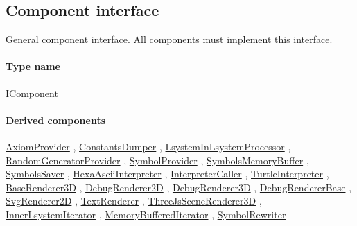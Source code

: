 \subsection{Component interface}
\label{Malsys.Processing.Components.IComponent}
General component interface. All components must implement this interface.\paragraph{Type name}
IComponent	\paragraph{Derived components}
		\hyperref[Malsys.Processing.Components.Common.AxiomProvider]{AxiomProvider}%
, 		\hyperref[Malsys.Processing.Components.Common.ConstantsDumper]{ConstantsDumper}%
, 		\hyperref[Malsys.Processing.Components.Common.LsystemInLsystemProcessor]{LsystemInLsystemProcessor}%
, 		\hyperref[Malsys.Processing.Components.Common.RandomGeneratorProvider]{RandomGeneratorProvider}%
, 		\hyperref[Malsys.Processing.Components.Common.SymbolProvider]{SymbolProvider}%
, 		\hyperref[Malsys.Processing.Components.Common.SymbolsMemoryBuffer]{SymbolsMemoryBuffer}%
, 		\hyperref[Malsys.Processing.Components.Common.SymbolsSaver]{SymbolsSaver}%
, 		\hyperref[Malsys.Processing.Components.Interpreters.HexaAsciiInterpreter]{HexaAsciiInterpreter}%
, 		\hyperref[Malsys.Processing.Components.Interpreters.InterpreterCaller]{InterpreterCaller}%
, 		\hyperref[Malsys.Processing.Components.Interpreters.TurtleInterpreter]{TurtleInterpreter}%
, 		\hyperref[Malsys.Processing.Components.Renderers.BaseRenderer3D]{BaseRenderer3D}%
, 		\hyperref[Malsys.Processing.Components.Renderers.DebugRenderer2D]{DebugRenderer2D}%
, 		\hyperref[Malsys.Processing.Components.Renderers.DebugRenderer3D]{DebugRenderer3D}%
, 		\hyperref[Malsys.Processing.Components.Renderers.DebugRendererBase]{DebugRendererBase}%
, 		\hyperref[Malsys.Processing.Components.Renderers.SvgRenderer2D]{SvgRenderer2D}%
, 		\hyperref[Malsys.Processing.Components.Renderers.TextRenderer]{TextRenderer}%
, 		\hyperref[Malsys.Processing.Components.Renderers.ThreeJsSceneRenderer3D]{ThreeJsSceneRenderer3D}%
, 		\hyperref[Malsys.Processing.Components.RewriterIterators.InnerLsystemIterator]{InnerLsystemIterator}%
, 		\hyperref[Malsys.Processing.Components.RewriterIterators.MemoryBufferedIterator]{MemoryBufferedIterator}%
, 		\hyperref[Malsys.Processing.Components.Rewriters.SymbolRewriter]{SymbolRewriter}%

